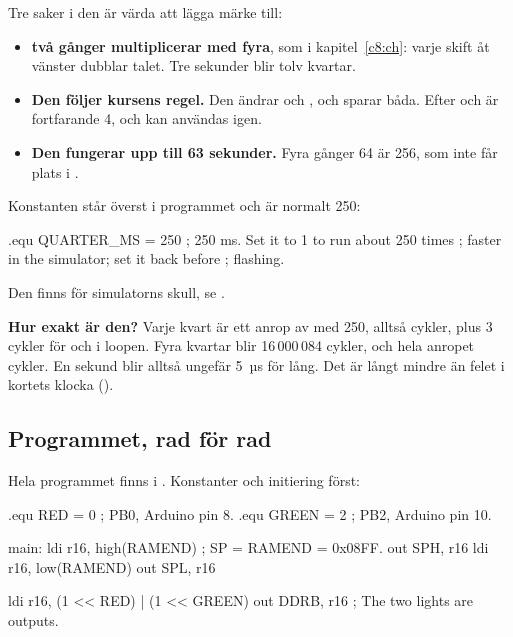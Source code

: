 \noindent Tre saker i den är värda att lägga märke till:
\begin{itemize}
  \item \textbf{ två gånger multiplicerar med fyra}, som i kapitel~\ref{c8:ch}: varje
    skift åt vänster dubblar talet. Tre sekunder blir tolv kvartar.
  \item \textbf{Den följer kursens regel.} Den ändrar  och , och sparar båda.
    Efter  och  är  fortfarande 4, och kan användas
    igen.
  \item \textbf{Den fungerar upp till 63 sekunder.} Fyra gånger 64 är 256, som inte får plats i
    .
\end{itemize}

Konstanten  står överst i programmet och är normalt 250:

\begin{asmcode}
.equ QUARTER_MS = 250               ; 250 ms. Set it to 1 to run about 250 times
                                    ; faster in the simulator; set it back before
                                    ; flashing.
\end{asmcode}

\noindent Den finns för simulatorns skull, se .

\textbf{Hur exakt är den?} Varje kvart är ett anrop av  med 250, alltså
\mbox{} cykler, plus 3 cykler för  och  i loopen. Fyra
kvartar blir 16\,000\,084 cykler, och hela anropet \mbox{} cykler. En
sekund blir alltså ungefär 5~µs för lång. Det är långt mindre än felet i kortets klocka
().

\subsection{Programmet, rad för rad}
\label{c11:b5}
Hela programmet finns i . Konstanter och initiering först:

\begin{asmcode}
.equ RED = 0                        ; PB0, Arduino pin 8.
.equ GREEN = 2                      ; PB2, Arduino pin 10.

main:
    ldi r16, high(RAMEND)           ; SP = RAMEND = 0x08FF.
    out SPH, r16
    ldi r16, low(RAMEND)
    out SPL, r16

    ldi r16, (1 << RED) | (1 << GREEN)
    out DDRB, r16                   ; The two lights are outputs.
\end{asmcode}

